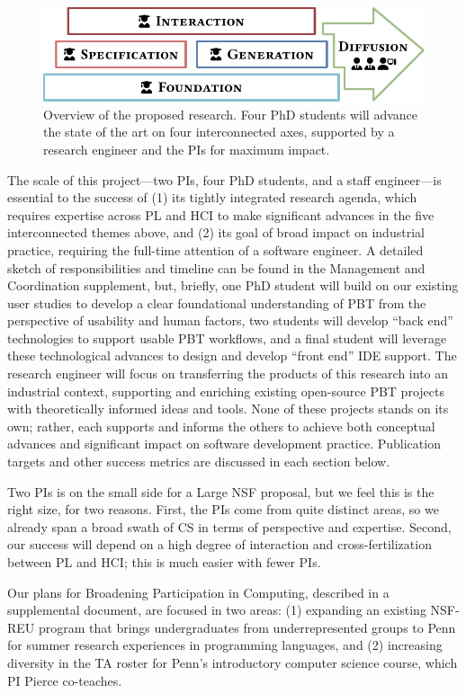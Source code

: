%
\begin{figure}
  \centering
  \includegraphics[width=.6\textwidth]{assets/overview.pdf}
  \caption{Overview of the proposed research. Four PhD students
  will advance the state of the art on four interconnected axes, supported by a
  research engineer and the PIs for maximum impact.}
  \label{overview}
\end{figure}
%
The scale of this project---two PIs, four PhD students, and a staff
engineer---is essential to the success of (1) its
tightly integrated research agenda, which requires expertise across PL and
HCI to make significant advances in the five interconnected themes above, and (2) its
goal of broad impact on industrial
practice, requiring the full-time attention of a software engineer.
%
A detailed sketch of responsibilities and timeline can be found in the
Management and Coordination supplement, but, briefly,
one PhD student will build on our existing user studies to
develop a clear foundational understanding of
PBT from the perspective of usability and human factors, two students
will develop ``back end'' technologies to support usable
PBT workflows, and a final student will leverage these technological
advances to design and develop ``front end'' IDE support. The
research engineer will focus on transferring the
products of this research into an industrial context, supporting and enriching
existing open-source PBT projects with theoretically informed ideas
and tools. None of these
projects stands on its own; rather, each supports and informs the
others to achieve both conceptual advances and significant
impact on software development practice.
%
Publication targets and other success metrics are discussed in each
section below.

Two PIs is on the small side for a Large NSF proposal, but  we feel this
is the right size, for two reasons. First, the PIs
come from quite distinct areas, so we already span a
broad swath of CS in terms of perspective and expertise.  Second,
our success will depend on a high degree of
interaction and cross-fertilization between PL and HCI; this is much
easier with fewer PIs.

Our plans for Broadening Participation in Computing, described in a
supplemental document, are focused in two areas: (1) expanding an
existing NSF-REU program that brings undergraduates from
underrepresented groups to Penn for summer research experiences in
programming languages, and (2) increasing diversity in the TA roster
for Penn's introductory computer science course, which PI Pierce
co-teaches.

